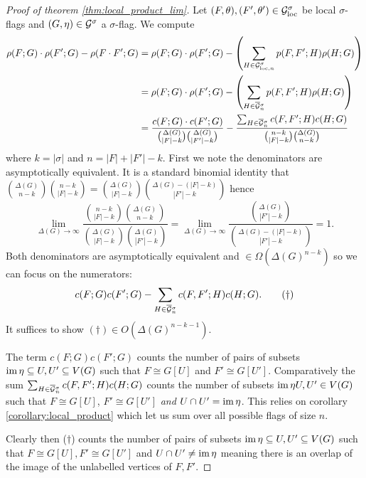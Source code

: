 \begin{proof}[Proof of theorem \ref{thm:local_product_lim}]
    Let $(F,\theta), (F',\theta') \in\mathcal{G}_\mathrm{loc}^\sigma$ be local $\sigma$-flags and
    $(G,\eta) \in \mathcal{G}^\sigma$ a
    $\sigma$-flag. We compute
    \[
        \begin{split}
            \rho(F; G)\cdot\rho(F';G) -\rho(F\cdot F'; G)
            &= \rho(F; G)\cdot\rho(F';G)
                - \left(\sum_{H\in\mathcal{G}_{\mathrm{loc},n}^\sigma} p(F, F'; H)\rho(H; G) \right)\\
            &= \rho(F; G)\cdot\rho(F';G)
                - \left(\sum_{H\in\overline{\mathcal{G}}{}_n^\sigma} p(F, F'; H)\rho(H; G) \right)\\
            &= \frac{c(F; G)\cdot c(F';G)}{\binom{\Delta(G)}{|F|-k}\binom{\Delta(G)}{|F'|-k}}
                - \frac{\sum_{H\in\overline{\mathcal{G}}{}^\sigma_n} c(F, F'; H)c(H; G)}
                {\binom{n-k}{|F|-k}\binom{\Delta(G)}{n-k}}
            \end{split}
    \]
    where $k=|\sigma|$ and $n=|F|+|F'|-k$.
    First we note the denominators are asymptotically equivalent. It is a standard
    binomial identity that
    $\binom{\Delta(G)}{n-k}\binom{n-k}{|F|-k} = \binom{\Delta(G)}{|F|-k}\binom{\Delta(G)-(|F|-k)}{|F'|-k}$
    hence
    \[
        \lim_{\Delta(G)\to\infty}
        \frac{\binom{n-k}{|F|-k}\binom{\Delta(G)}{n-k}}{\binom{\Delta(G)}{|F|-k}\binom{\Delta(G)}{|F'|-k}}
        = \lim_{\Delta(G)\to\infty}
        \frac{\binom{\Delta(G)}{|F'|-k}}{\binom{\Delta(G)-(|F|-k)}{|F'|-k}}
        = 1.
    \]
    Both denominators are asymptotically equivalent and $\in\Omega(\Delta(G)^{n-k})$ so we
    can focus on the numerators:
    \[
        c(F;G)c(F';G) - \sum_{H\in\overline{\mathcal{G}}{}^\sigma_n}c(F,F';H)c(H;G).
        \tag{$\dagger$}
    \]
    It suffices to show $(\dagger) \in O(\Delta(G)^{n-k-1})$.

    The term $c(F; G)c(F';G)$ counts the number of pairs of subsets
    $\operatorname{im}\eta \subseteq U, U' \subseteq V(G)$ such that $F \cong G[U]$ and $F'\cong G[U']$.
    Comparatively the sum $\sum_{H\in\overline{\mathcal{G}}{}^\sigma_n} c(F, F'; H)c(H; G)$ counts the number
    of subsets $\operatorname{im}\eta U, U' \in V(G)$ such that $F\cong G[U]$, $F'\cong G[U']$ \textit{and}
    $U \cap U' = \operatorname{im} \eta$. This relies on
    corollary \ref{corollary:local_product}
    which let us sum over all possible flags of size $n$.

    Clearly then ($\dagger$) counts the
    number of pairs of subsets $\operatorname{im}\eta \subseteq U, U' \subseteq V(G)$ such that
    $F \cong G[U], F'\cong G[U']$ and $U \cap U' \neq \operatorname{im} \eta$ meaning there is
    an overlap of the image of the unlabelled vertices of $F, F'$.


\end{proof}
